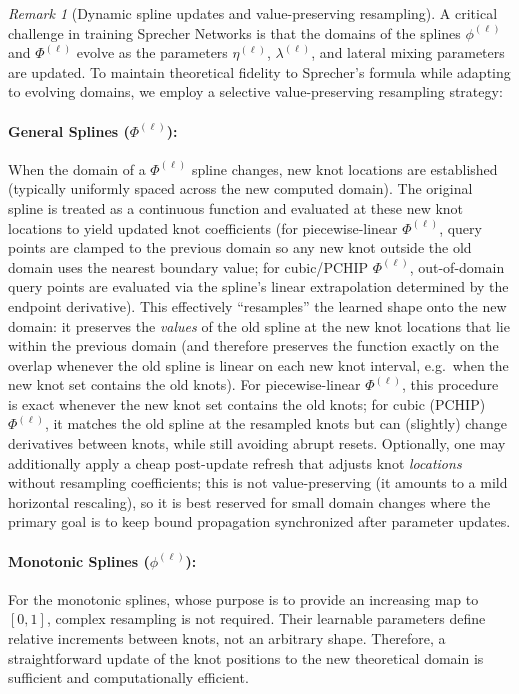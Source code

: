 \documentclass{article}
\theoremstyle{plain}
\theoremstyle{definition}
\theoremstyle{remark}
\newtheorem{remark}{Remark}
\begin{document}
\begin{remark}[Dynamic spline updates and value-preserving resampling]
A critical challenge in training Sprecher Networks is that the domains of the splines $\phi^{(\ell)}$ and $\Phi^{(\ell)}$ evolve as the parameters $\eta^{(\ell)}$, $\lambda^{(\ell)}$, and lateral mixing parameters are updated. To maintain theoretical fidelity to Sprecher's formula while adapting to evolving domains, we employ a selective value-preserving resampling strategy:

\paragraph{General Splines ($\Phi^{(\ell)}$):} When the domain of a $\Phi^{(\ell)}$ spline changes, new knot locations are established (typically uniformly spaced across the new computed domain). The original spline is treated as a continuous function and evaluated at these new knot locations to yield updated knot coefficients (for piecewise-linear $\Phi^{(\ell)}$, query points are clamped to the previous domain so any new knot outside the old domain uses the nearest boundary value; for cubic/\textsc{PCHIP} $\Phi^{(\ell)}$, out-of-domain query points are evaluated via the spline's linear extrapolation determined by the endpoint derivative). This effectively ``resamples'' the learned shape onto the new domain: it preserves the \emph{values} of the old spline at the new knot locations that lie within the previous domain (and therefore preserves the function exactly on the overlap whenever the old spline is linear on each new knot interval, e.g.\ when the new knot set contains the old knots). For piecewise-linear $\Phi^{(\ell)}$, this procedure is exact whenever the new knot set contains the old knots; for cubic (PCHIP) $\Phi^{(\ell)}$, it matches the old spline at the resampled knots but can (slightly) change derivatives between knots, while still avoiding abrupt resets. Optionally, one may additionally apply a cheap post-update refresh that adjusts knot \emph{locations} without resampling coefficients; this is not value-preserving (it amounts to a mild horizontal rescaling), so it is best reserved for small domain changes where the primary goal is to keep bound propagation synchronized after parameter updates.

\paragraph{Monotonic Splines ($\phi^{(\ell)}$):} For the monotonic splines, whose purpose is to provide an increasing map to $[0,1]$, complex resampling is not required. Their learnable parameters define relative increments between knots, not an arbitrary shape. Therefore, a straightforward update of the knot positions to the new theoretical domain is sufficient and computationally efficient.


\end{remark}
\end{document}

